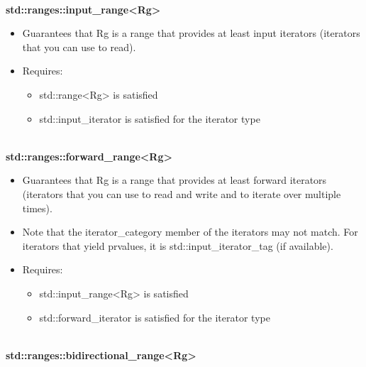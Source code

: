 \noindent
\hspace*{\fill} \\ %
\textbf{std::ranges::input\_range<Rg>}

\begin{itemize}
\item
Guarantees that Rg is a range that provides at least input iterators (iterators that you can use to read).

\item
Requires:

\begin{itemize}
\item
std::range<Rg> is satisfied

\item
std::input\_iterator is satisfied for the iterator type
\end{itemize}
\end{itemize}

\noindent
\hspace*{\fill} \\ %
\textbf{std::ranges::forward\_range<Rg>}

\begin{itemize}
\item
Guarantees that Rg is a range that provides at least forward iterators (iterators that you can use to read and write and to iterate over multiple times).

\item
Note that the iterator\_category member of the iterators may not match. For iterators that yield prvalues, it is std::input\_iterator\_tag (if available).

\item
Requires:

\begin{itemize}
\item
std::input\_range<Rg> is satisfied

\item
std::forward\_iterator is satisfied for the iterator type
\end{itemize}
\end{itemize}

\noindent
\hspace*{\fill} \\ %
\textbf{std::ranges::bidirectional\_range<Rg>}

